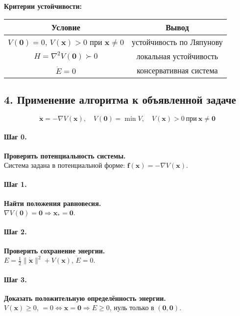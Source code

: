\textbf{Критерии устойчивости:}
\begin{center}
\begin{tabular}{|c|c|}
\hline
\textbf{Условие} & \textbf{Вывод} \\ \hline
\(V(\mathbf 0)=0\), \(V(\mathbf x)>0\) при \(\mathbf x\neq 0\) & устойчивость по Ляпунову \\ \hline
\(H=\nabla^{2}V(\mathbf 0)\succ 0\) & локальная устойчивость \\ \hline
\(\dot E=0\) & консервативная система \\ \hline
\end{tabular}
\end{center}

\subsection*{4. Применение алгоритма к объявленной задаче}

\[
\ddot{\mathbf x}=-\nabla V(\mathbf x),\quad V(\mathbf 0)=\min V,\quad V(\mathbf x)>0\ \text{при}\ \mathbf x\neq \mathbf 0
\]

\paragraph{Шаг 0.} \textbf{Проверить потенциальность системы.}\\
Система задана в потенциальной форме: \(\mathbf f(\mathbf x)=-\nabla V(\mathbf x)\).

\paragraph{Шаг 1.} \textbf{Найти положения равновесия.}\\
\(\nabla V(\mathbf 0)=\mathbf 0\Rightarrow \mathbf x_*=\mathbf 0\).

\paragraph{Шаг 2.} \textbf{Проверить сохранение энергии.}\\
\(E=\tfrac12\|\dot{\mathbf x}\|^{2}+V(\mathbf x)\), \(\dot E=0\).

\paragraph{Шаг 3.} \textbf{Доказать положительную определённость энергии.}\\
\(V(\mathbf x)\ge0\), \(=0\Leftrightarrow \mathbf x=\mathbf 0\Rightarrow E\ge0\), нуль только в \((\mathbf 0,\mathbf 0)\).

